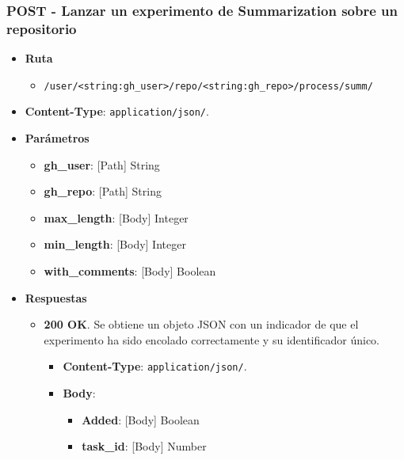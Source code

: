 \subsubsection{POST - Lanzar un experimento de Summarization sobre un repositorio}

\begin{itemize}
    \item[] \textbf{Ruta}
        \begin{itemize} \setlength\itemsep{0.2em}
            \item[] \texttt{/user/<string:gh\_user>/repo/<string:gh\_repo>/process/summ/}
        \end{itemize}
    \item[] \textbf{Content-Type}: \texttt{application/json/}.
    \item[] \textbf{Parámetros}
        \begin{itemize} \setlength\itemsep{0.2em}
            \item[] \textbf{gh\_user}: [Path] String
            \item[] \textbf{gh\_repo}: [Path] String
            \item[] \textbf{max\_length}: [Body] Integer
            \item[] \textbf{min\_length}: [Body] Integer
            \item[] \textbf{with\_comments}: [Body] Boolean
        \end{itemize}
    \item[] \textbf{Respuestas}
        \begin{itemize} \setlength\itemsep{0.2em}
            \item[] \textbf{200 OK}. Se obtiene un objeto JSON con un indicador de que el experimento ha sido encolado correctamente y su identificador único.
                \begin{itemize} \setlength\itemsep{0.2em}
                    \item[] \textbf{Content-Type}: \texttt{application/json/}.
                    \item[] \textbf{Body}: 
                        \begin{itemize} \setlength\itemsep{0.2em}
                            \item[] \textbf{Added}: [Body] Boolean
                            \item[] \textbf{task\_id}: [Body] Number
                        \end{itemize}
                \end{itemize}

\end{itemize}
\end{itemize}
